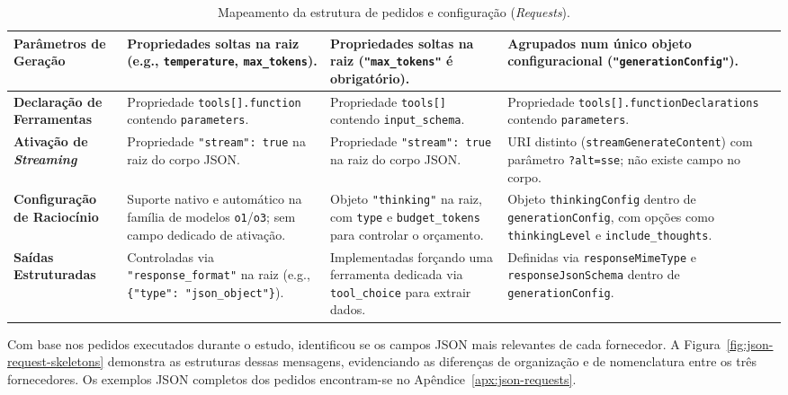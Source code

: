 \begin{table}[H]
\begin{tabularx}{\textwidth}{|>{\raggedright\arraybackslash}p{2.8cm}|Y|Y|Y|}
        \hline
        \textbf{Parâmetros de Geração} & Propriedades soltas na raiz (e.g., \texttt{temperature}, \texttt{max\_tokens}). & Propriedades soltas na raiz (\texttt{"max\_tokens"} é obrigatório). & Agrupados num único objeto configuracional (\texttt{"generation}\allowbreak\texttt{Config"}). \\
        \hline
        \textbf{Declaração de Ferramentas} & Propriedade \texttt{tools[].function} contendo \texttt{parameters}. & Propriedade \texttt{tools[]} contendo \texttt{input\_schema}. & Propriedade \texttt{tools[].}\allowbreak\texttt{functionDeclarations} contendo \texttt{parameters}. \\
        \hline
        \textbf{Ativação de \textit{Streaming}} & Propriedade \texttt{"stream": true} na raiz do corpo JSON. & Propriedade \texttt{"stream": true} na raiz do corpo JSON. & URI distinto (\texttt{streamGenerate}\allowbreak\texttt{Content}) com parâmetro \texttt{?alt=sse}; não existe campo no corpo. \\
        \hline
        \textbf{Configuração de Raciocínio} & Suporte nativo e automático na família de modelos \texttt{o1}/\texttt{o3}; sem campo dedicado de ativação. & Objeto \texttt{"thinking"} na raiz, com \texttt{type} e \texttt{budget\_tokens} para controlar o orçamento. & Objeto \texttt{thinkingConfig} dentro de \texttt{generationConfig}, com opções como \texttt{thinkingLevel} e \texttt{include\_thoughts}. \\
        \hline
        \textbf{Saídas Estruturadas} & Controladas via \texttt{"response\_}\allowbreak\texttt{format"} na raiz (e.g., \texttt{\{"type": "json\_object"\}}). & Implementadas forçando uma ferramenta dedicada via \texttt{tool\_choice} para extrair dados. & Definidas via \texttt{responseMimeType} e \texttt{responseJsonSchema} dentro de \texttt{generationConfig}. \\
        \hline
    \end{tabularx}
    \caption{Mapeamento da estrutura de pedidos e configuração (\textit{Requests}).}
    \label{tab:api-request-comparison}
\end{table}

    Com base nos pedidos executados durante o estudo, identificou se os campos JSON mais relevantes de cada fornecedor. A Figura~\ref{fig:json-request-skeletons} demonstra as estruturas dessas mensagens, evidenciando as diferenças de organização e de nomenclatura entre os três fornecedores. Os exemplos JSON completos dos pedidos encontram-se no Apêndice~\ref{apx:json-requests}.

